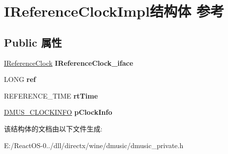 \hypertarget{struct_i_reference_clock_impl}{}\section{I\+Reference\+Clock\+Impl结构体 参考}
\label{struct_i_reference_clock_impl}
\subsection*{Public 属性}
\begin{DoxyCompactItemize}
\item 
\mbox{\label{struct_i_reference_clock_impl_af4995811c0837f7131401fc5435a99d5}} 
\hyperlink{interface_i_reference_clock}{I\+Reference\+Clock} {\bfseries I\+Reference\+Clock\+\_\+iface}
\item 
\mbox{\label{struct_i_reference_clock_impl_a8c326f626edf9bdebb445f90c52f672f}} 
L\+O\+NG {\bfseries ref}
\item 
\mbox{\label{struct_i_reference_clock_impl_aa2e500ad1cb008e37eec47f1f27bafac}} 
R\+E\+F\+E\+R\+E\+N\+C\+E\+\_\+\+T\+I\+ME {\bfseries rt\+Time}
\item 
\mbox{\label{struct_i_reference_clock_impl_a40fa8c2537176e8552ae5d595d1b1019}} 
\hyperlink{struct___d_m_u_s___c_l_o_c_k_i_n_f_o8}{D\+M\+U\+S\+\_\+\+C\+L\+O\+C\+K\+I\+N\+FO} {\bfseries p\+Clock\+Info}
\end{DoxyCompactItemize}


该结构体的文档由以下文件生成\+:\begin{DoxyCompactItemize}
\item 
E\+:/\+React\+O\+S-\/0../dll/directx/wine/dmusic/dmusic\+\_\+private.\+h\end{DoxyCompactItemize}
